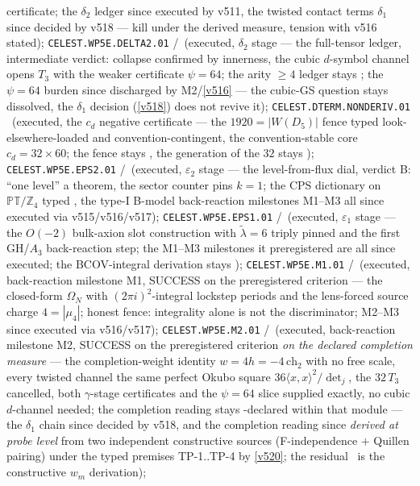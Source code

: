 \documentclass[11pt,a4paper]{article}
\newcommand{\Z}{\mathbb Z}
\begin{document}
certificate; the $\delta_2$ ledger since executed by v511, the twisted contact terms $\delta_1$
since decided by v518 --- kill under the derived measure, tension with v516 stated);
\texttt{CELEST.WP5E.DELTA2.01} \mE/\mC\ (executed, $\delta_2$ stage --- the full-tensor ledger,
intermediate verdict: collapse confirmed by innerness, the cubic $d$-symbol channel opens $T_3$
with the weaker certificate $\psi=64$; the arity $\ge4$ ledger stays \mO; the $\psi=64$ burden
since discharged by M2/\vref{v516} --- the cubic-GS question stays dissolved, the $\delta_1$
decision (\vref{v518}) does not revive it);
\texttt{CELEST.DTERM.NONDERIV.01} \mE\ (executed, the $c_d$ negative certificate --- the
$1920=|W(D_5)|$ fence typed look-elsewhere-loaded and convention-contingent, the convention-stable
core $c_d=32\times60$; the fence stays \mC, the generation of the $32$ stays \mO);
\texttt{CELEST.WP5E.EPS2.01} \mE/\mC\ (executed, $\varepsilon_2$ stage --- the level-from-flux
dial, verdict B: ``one level'' a theorem, the sector counter pins $k=1$; the CPS dictionary on
$\mathbb{PT}/\Z_4$ typed \mC, the type-I B-model back-reaction milestones M1--M3 all since
executed via v515/v516/v517);
\texttt{CELEST.WP5E.EPS1.01} \mE/\mC\ (executed, $\varepsilon_1$ stage --- the $O(-2)$
bulk-axion slot construction with $\tilde\lambda=6$ triply pinned and the first GH/$A_3$
back-reaction step; the M1--M3 milestones it preregistered are all since executed; the
BCOV-integral derivation stays \mO);
\texttt{CELEST.WP5E.M1.01} \mE/\mC\ (executed, back-reaction milestone M1, SUCCESS on the
preregistered criterion --- the closed-form $\Omega_N$ with $(2\pi i)^2$-integral lockstep
periods and the lens-forced source charge $4=|\mu_4|$; honest fence: integrality alone is not
the discriminator; M2--M3 since executed via v516/v517);
\texttt{CELEST.WP5E.M2.01} \mE/\mC\ (executed, back-reaction milestone M2, SUCCESS on the
preregistered criterion \emph{on the declared completion measure} --- the completion-weight
identity $w=4h=-4\,\mathrm{ch}_2$ with no free scale, every twisted channel the same perfect
Okubo square $36\langle x,x\rangle^2/\det_j$, the $32\,T_3$ cancelled, both $\gamma$-stage
certificates and the $\psi=64$ slice supplied exactly, no cubic $d$-channel needed; the
completion reading stays \mC-declared within that module --- the $\delta_1$ chain since decided
by v518, and the completion reading since \emph{derived at probe level} from two independent
constructive sources (F-independence $+$ Quillen pairing) under the typed premises TP-1..TP-4
by \vref{v520}; the residual \mO\ is the constructive $w_m$ derivation);
\end{document}
